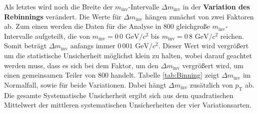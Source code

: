 \newline
Als letztes wird noch die Breite der $m_\text{inv}$-Intervalle $\Delta m_\text{inv}$ in der \textbf{Variation des Rebinnings} verändert.
Die Werte für $\Delta m_\text{inv}$ hängen zunächst von zwei Faktoren ab.
Zum einen werden die Daten für die Analyse in $800$ gleichgroße $m_\text{inv}$-Intervalle aufgeteilt, die von $m_\text{inv} = 0\,0 \text{ GeV}/c^{2}$ bis $m_\text{inv} = 0\,8 \text{ GeV}/c^{2}$ reichen.
Somit beträgt $\Delta m_\text{inv}$ anfangs immer $0\,001 \text{ GeV}/c^{2}$.
Dieser Wert wird vergrößert um die statistische Unsicherheit möglichst klein zu halten, wobei darauf geachtet werden muss, dass es sich bei dem Faktor, um den $\Delta m_\text{inv}$ vergrößert wird, um einen gemeinsamen Teiler von $800$ handelt.
Tabelle \ref{tab:Binning} zeigt $\Delta m_\text{inv}$ im Normalfall, sowie für beide Variationen.
Dabei hängt $\Delta m_\text{inv}$ zusätzlich von $p_\text{T}$ ab.
\newline
Die gesamte Systematische Unsicherheit ergibt sich aus dem quadratischen Mittelwert der mittleren systematischen Unsicherheiten der vier Variationsarten.